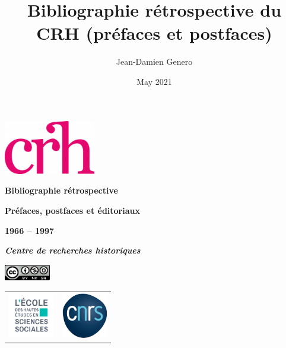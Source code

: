 \documentclass{article}
\title{Bibliographie rétrospective du CRH (préfaces et postfaces)}
\author{Jean-Damien Genero}
\date{May 2021}
\newcommand\blankpage{%
    \null
    \thispagestyle{empty}%
    \addtocounter{page}{-1}%
    \newpage}
\begin{document}
	
\renewcommand{\contentsname}{Sommaire}


\begin{titlepage}
	\begin{center}
		
		\vspace*{1,50cm}
		
		\includegraphics[width=4cm]{../../../img/logo_crh_magenta.png}
		\bigskip
		\bigskip
		\bigskip
		\bigskip
		
		\begin{Huge}
			\textbf{Bibliographie rétrospective}
			
			\bigskip
			
			\bigskip
			
			\textbf{Préfaces, postfaces et éditoriaux}
		\end{Huge}
		
		\begin{LARGE}
			\bigskip
			
			\bigskip
			
			\textbf{1966 -- 1997}
			
			\bigskip
			
			\textbf{\emph{Centre de recherches historiques} }\\
		\end{LARGE}
		
		\bigskip
		
		\vspace*{2.25cm}
		
		\includegraphics[width=2cm]{../../../img/licenseccby-nc-sa4.0.png}
		
		\vspace*{3,5cm}
		
		\begin{tabular}{cc}
			\includegraphics[width=2cm]{../../../img/Logo_EHESS_2021_RVB.png} & \includegraphics[width=2cm]{../../../img/cnrslogo.png} \\
		\end{tabular}
		
	\end{center}
	\afterpage{\blankpage}
\end{titlepage}
\end{document}
